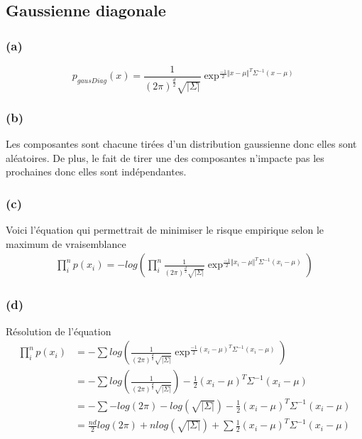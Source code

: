 \documentclass{article}
\begin{document}
	\subsection{Gaussienne diagonale}
	
	\subsubsection*{(a)}
	\begin{equation}
	p_{gausDiag}(x) = \frac{1}{(2\pi)^{\frac{d}{2}}\sqrt{\vert\Sigma\vert}}\exp^{\frac{-1}{2}\Vert x-\mu\Vert^T{\Sigma^{-1}}(x-\mu)}
	\end{equation}
	\subsubsection*{(b)}
	Les composantes sont chacune tirées d'un distribution gaussienne donc elles sont aléatoires. De plus, le fait de tirer une des composantes n'impacte pas les prochaines donc elles sont indépendantes.
	\subsubsection*{(c)}
	Voici l'équation qui permettrait de minimiser le risque empirique selon le maximum de vraisemblance
	\begin{equation}
	\begin{split}
		\prod_{i}^{n} p(x_{i}) = -log(\prod_{i}^{n}\frac{1}{(2\pi)^{\frac{d}{2}}\sqrt{\vert\Sigma\vert}}\exp^{\frac{-1}{2}\Vert x_{i}-\mu\Vert^T{\Sigma^{-1}}(x_{i}-\mu)})
	\end{split}
	\end{equation}
	\subsubsection*{(d)}
	Résolution de l'équation
		\begin{equation}
		\begin{split}
		\prod_{i}^{n} p(x_{i}) &=
		- \sum log(\frac{1}{(2\pi)^{\frac{d}{2}}\sqrt{\vert\Sigma\vert}}\exp^{\frac{-1}{2} (x_{i}-\mu)^T{\Sigma^{-1}}(x_{i}-\mu)}) \\		
		 &= -\sum log(\frac{1}{(2\pi)^{\frac{d}{2}}\sqrt{\vert\Sigma\vert}}) - \frac{1}{2}( x_{i}-\mu)^T{\Sigma^{-1}}(x_{i}-\mu) \\
		 &= -\sum -log(2\pi) - log(\sqrt{\vert\Sigma\vert}) - \frac{1}{2}( x_{i}-\mu)^T{\Sigma^{-1}}(x_{i}-\mu)\\
		 &=\frac{nd}{2} log(2\pi) + n log(\sqrt{\vert\Sigma\vert}) + \sum \frac{1}{2}( x_{i}-\mu)^T{\Sigma^{-1}}(x_{i}-\mu)		 
		\end{split}
		\end{equation}
	
\end{document}
